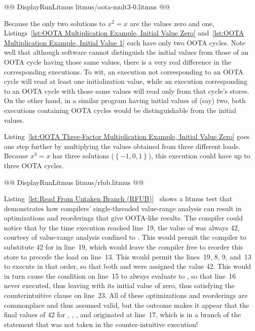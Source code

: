 \documentclass[10]{article}
\begin{document}
\begin{listing}[tbp]
@@ DisplayRunLitmus litmus/oota-mult3-0.litmus @@
\caption{OOTA Three-Factor Multiplication Example, Initial Value Zero}
\label{lst:OOTA Three-Factor Multiplication Example, Initial Value Zero}
\end{listing}

Because the only two solutions to $x^2 = x$ are the values zero and one,
Listings~\ref{lst:OOTA Multiplication Example, Initial Value Zero}
and~\ref{lst:OOTA Multiplication Example, Initial Value 1}
each have only two OOTA cycles.
Note well that although software cannot distinguish the initial
values from those of an OOTA cycle having those same values, there is
a very real difference in the corresponding executions.
To wit, an execution not corresponding to an OOTA cycle will read at
least one initialization value, while an execution corresponding to an
OOTA cycle with those same values will read only from that cycle's stores.
On the other hand, in a similar program having initial values of (say)
two, both executions containing OOTA cycles would be distinguishable
from the initial values.

Listing~\ref{lst:OOTA Three-Factor Multiplication Example, Initial Value Zero}
goes one step further by multiplying the values obtained from three
different loads.
Because $x^3 = x$ has three solutions ($\left\{ -1, 0, 1 \right\}$),
this execution could have up to three OOTA cycles.

\begin{listing}[tbp]
@@ DisplayRunLitmus litmus/rfub.litmus @@
\caption{Read From Untaken Branch (RFUB)}
\label{lst:Read From Untaken Branch (RFUB)}
\end{listing}

Listing~\ref{lst:Read From Untaken Branch (RFUB)}~\cite{HansBoehm2019OOTArevisitedAgain}
shows a litmus test that demonstrates how compilers' single-threaded
value-range analysis can result in optimizations and reorderings that
give OOTA-like results.
The compiler could notice that by the time execution reached line~19,
the value of  was always 42, courtesy of value-range analysis
confined to .
This would permit the compiler to substitute 42 for  in line~19,
which would leave the compiler free to reorder this store to precede
the load on line~13.
This would permit the lines~19, 8, 9, and~13 to execute in that order,
so that both  and  were assigned the value 42.
This would in turn cause the  condition on line~15 to always
evaluate to , so that line~16 never executed, thus leaving
 with its initial value of zero, thus satisfying the
counterintuitive  clause on line~23.
All of these optimizations and reorderings are commonplace and thus
assumed valid, but the outcome makes it appear that the final values
of 42 for , , , and  originated at line~17,
which is in a branch of the  statement that was not taken
in the counter-intuitive execution!
\end{document}
